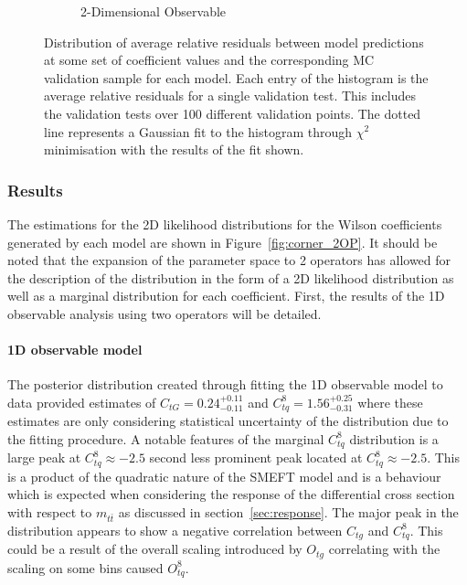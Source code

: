 \documentclass[a4paper,11pt]{article}
\begin{document}
\begin{figure}[H]
\begin{subfigure}[b]{0.4\textwidth}
        \caption{2-Dimensional Observable}
    \end{subfigure}
    \caption{Distribution of average relative residuals between model predictions at some set of coefficient values and the corresponding MC validation sample for each model. Each entry of the histogram is the average relative residuals for a single validation test. This includes the validation tests over 100 different validation points. The dotted line represents a Gaussian fit to the histogram through $\chi^2$ minimisation with the results of the fit shown.}
    \label{fig:residuals_hist}
\end{figure}

\subsubsection{Results}

The estimations for the 2D likelihood distributions for the Wilson coefficients generated by each model are shown in Figure~\ref{fig:corner_2OP}.
It should be noted that the expansion of the parameter space to 2 operators has allowed for the description of the distribution in the form of a 2D likelihood distribution as well as a marginal distribution for each coefficient.
First, the results of the 1D observable analysis using two operators will be detailed.

\paragraph{1D observable model}

The posterior distribution created through fitting the 1D observable model to data provided estimates of $C_{tG}=0.24^{+0.11}_{-0.11}$ and $C_{tq}^{8}=1.56^{+0.25}_{-0.31}$ where these estimates are only considering statistical uncertainty of the distribution due to the fitting procedure.
A notable features of the marginal $C_{tq}^{8}$ distribution is a large peak at $C_{tq}^{8}\approx-2.5$ second less prominent peak located at $C_{tq}^{8}\approx-2.5$.
This is a product of the quadratic nature of the SMEFT model and is a behaviour which is expected when considering the response of the differential cross section with respect to $m_{t\bar{t}}$ as discussed in section~\ref{sec:response}.
The major peak in the distribution appears to show a negative correlation between $C_{tg}$ and $C_{tq}^8$.
This could be a result of the overall scaling introduced by $O_{tg}$ correlating with the scaling on some bins caused $O_{tq}^{8}$.
\end{document}
